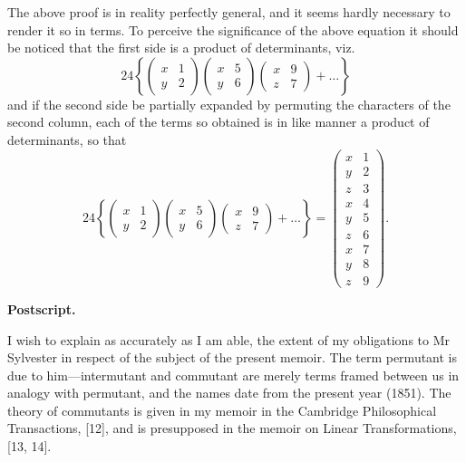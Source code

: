 \documentclass[11pt,a4paper]{book}
\begin{document}
The above proof is in reality perfectly general, and it seems hardly necessary to render it so in terms. To perceive the significance of the above equation it should be noticed that the first side is a product of determinants, viz.
\[24 \left\{ \begin{pmatrix} x & 1 \\ y & 2 \end{pmatrix} \begin{pmatrix} x & 5 \\ y & 6 \end{pmatrix} \begin{pmatrix} x & 9 \\ z & 7 \end{pmatrix} + \ldots \right\}\]
and if the second side be partially expanded by permuting the characters of the second column, each of the terms so obtained is in like manner a product of determinants, so that
\[24 \left\{ \begin{pmatrix} x & 1 \\ y & 2 \end{pmatrix} \begin{pmatrix} x & 5 \\ y & 6 \end{pmatrix} \begin{pmatrix} x & 9 \\ z & 7 \end{pmatrix} + \ldots \right\} = \begin{pmatrix} x & 1 \\ y & 2 \\ z & 3 \\ \hline x & 4 \\ y & 5 \\ z & 6 \\ \hline x & 7 \\ y & 8 \\ z & 9 \end{pmatrix}.\]

\bigskip
\noindent\textbf{Postscript.}

I wish to explain as accurately as I am able, the extent of my obligations to Mr Sylvester in respect of the subject of the present memoir. The term permutant is due to him---intermutant and commutant are merely terms framed between us in analogy with permutant, and the names date from the present year (1851). The theory of commutants is given in my memoir in the Cambridge Philosophical Transactions, [12], and is presupposed in the memoir on Linear Transformations, [13, 14].
\end{document}
